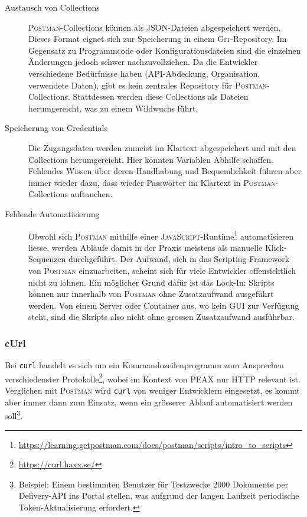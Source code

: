 \begin{description}
    \item[Austausch von Collections] \textsc{Postman}-Collections können als JSON-Dateien abgespeichert werden. Dieses Format eignet sich zur Speicherung in einem \textsc{Git}-Repository. Im Gegensatz zu Programmcode oder Konfigurationsdateien sind die einzelnen Änderungen jedoch schwer nachzuvollziehen. Da die Entwickler verschiedene Bedürfnisse haben (API-Abdeckung, Organisation, verwendete Daten), gibt es kein zentrales Repository für \textsc{Postman}-Collections. Stattdessen werden diese Collections als Dateien herumgereicht, was zu einem Wildwuchs führt.
    \item[Speicherung von Credentials] Die Zugangsdaten werden zumeist im Klartext abgespeichert und mit den Collections herumgereicht. Hier könnten Variablen Abhilfe schaffen. Fehlendes Wissen über deren Handhabung und Bequemlichkeit führen aber immer wieder dazu, dass wieder Passwörter im Klartext in \textsc{Postman}-Collections auftauchen.
    \item[Fehlende Automatisierung] Obwohl sich \textsc{Postman} mithilfe einer \textsc{JavaScript}-Runtime\footnote{\url{https://learning.getpostman.com/docs/postman/scripts/intro_to_scripts}} automatisieren liesse, werden Abläufe damit in der Praxis meistens als manuelle Klick-Sequenzen durchgeführt. Der Aufwand, sich in das Scripting-Framework von \textsc{Postman} einzuarbeiten, scheint sich für viele Entwickler offensichtlich nicht zu lohnen. Ein möglicher Grund dafür ist das Lock-In: Skripts können nur innerhalb von \textsc{Postman} ohne Zusatzaufwand ausgeführt werden. Von einem Server oder Container aus, wo kein GUI zur Verfügung steht, sind die Skripts also nicht ohne grossen Zusatzaufwand ausführbar.
\end{description}

\subsubsection{cUrl}

Bei \texttt{curl} handelt es sich um ein Kommandozeilenprogramm zum Ansprechen verschiedenster Protokolle\footnote{\url{https://curl.haxx.se/}}, wobei im Kontext von PEAX nur HTTP relevant ist. Verglichen mit \textsc{Postman} wird \texttt{curl} von weniger Entwicklern eingesetzt, es kommt aber immer dann zum Einsatz, wenn ein grösserer Ablauf automatisiert werden soll\footnote{Beispiel: Einem bestimmten Benutzer für Testzwecke 2000 Dokumente per Delivery-API ins Portal stellen, was aufgrund der langen Laufzeit periodische Token-Aktualisierung erfordert.}.


